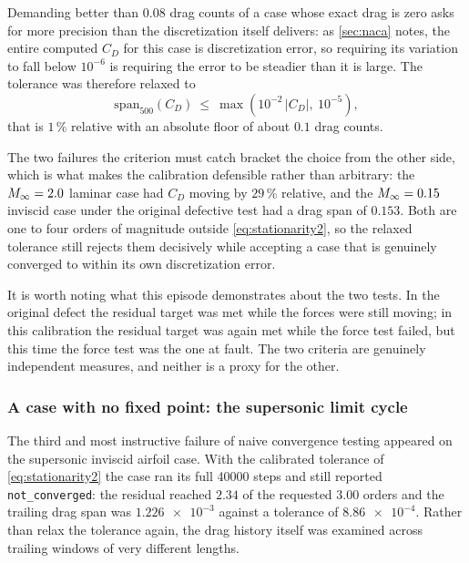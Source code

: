 Demanding better than $0.08$ drag counts of a case whose exact drag is zero asks
for more precision than the discretization itself delivers: as
\cref{sec:naca} notes, the entire computed $C_D$ for this case is discretization
error, so requiring its variation to fall below $10^{-6}$ is requiring the error
to be steadier than it is large. The tolerance was therefore relaxed to
\begin{equation}
  \mathrm{span}_{500}(C_D)\ \le\ \max\!\left(10^{-2}\,|C_D|,\ 10^{-5}\right),
  \label{eq:stationarity2}
\end{equation}
that is $1\,\%$ relative with an absolute floor of about $0.1$ drag counts.

The two failures the criterion must catch bracket the choice from the other side,
which is what makes the calibration defensible rather than arbitrary: the
$M_\infty=2.0$ laminar case had $C_D$ moving by $29\,\%$ relative, and the
$M_\infty=0.15$ inviscid case under the original defective test had a drag span of
$0.153$. Both are one to four orders of magnitude outside \cref{eq:stationarity2},
so the relaxed tolerance still rejects them decisively while accepting a case
that is genuinely converged to within its own discretization error.

It is worth noting what this episode demonstrates about the two tests. In the
original defect the residual target was met while the forces were still moving; in
this calibration the residual target was again met while the force test failed,
but this time the force test was the one at fault. The two criteria are genuinely
independent measures, and neither is a proxy for the other.

\subsubsection{A case with no fixed point: the supersonic limit cycle}
\label{sec:limitcycle}

The third and most instructive failure of naive convergence testing appeared on the
supersonic inviscid airfoil case. With the calibrated tolerance of
\cref{eq:stationarity2} the case ran its full \num{40000} steps and still reported
\texttt{not\_converged}: the residual reached $2.34$ of the requested $3.00$
orders and the trailing drag span was $\num{1.226e-3}$ against a tolerance of
$\num{8.86e-4}$. Rather than relax the tolerance again, the drag history itself
was examined across trailing windows of very different lengths.

